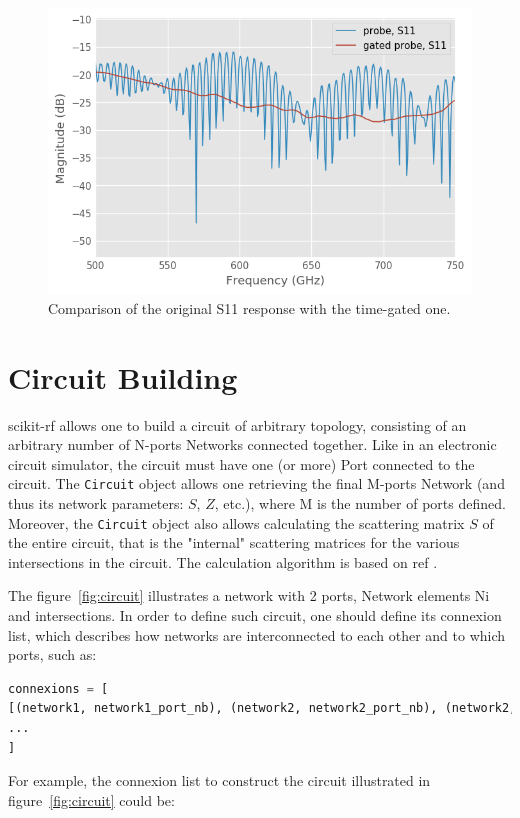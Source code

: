 \documentclass{IEEEjmw}
\begin{document}
\begin{figure}
	\centering
	\includegraphics[width=0.95\linewidth]{figures/gated1}
	\caption{Comparison of the original S11 response with the time-gated one.}
	\label{fig:timedomain1}
\end{figure}


\section{Circuit Building}
scikit-rf allows one to build a circuit of arbitrary topology, consisting of an arbitrary number of N-ports Networks connected together. Like in an electronic circuit simulator, the circuit must have one (or more) Port connected to the circuit. The \texttt{Circuit} object allows one retrieving the final M-ports Network (and thus its network parameters: $S$, $Z$, etc.), where M is the number of ports defined. Moreover, the \texttt{Circuit} object also allows calculating the scattering matrix $S$ of the entire circuit, that is the "internal" scattering matrices for the various intersections in the circuit. The calculation algorithm is based on ref \cite{hallbjorner2003}.

The figure~\ref{fig:circuit} illustrates a network with 2 ports, Network elements Ni and intersections. In order to define such circuit, one should define its connexion list, which describes how networks are interconnected to each other and to which ports, such as:
\begin{lstlisting}[language=Python]
connexions = [
[(network1, network1_port_nb), (network2, network2_port_nb), (network2, network2_port_nb), ...], 
...
]
\end{lstlisting}

For example, the connexion list to construct the circuit illustrated in figure~\ref{fig:circuit} could be:
\end{document}
